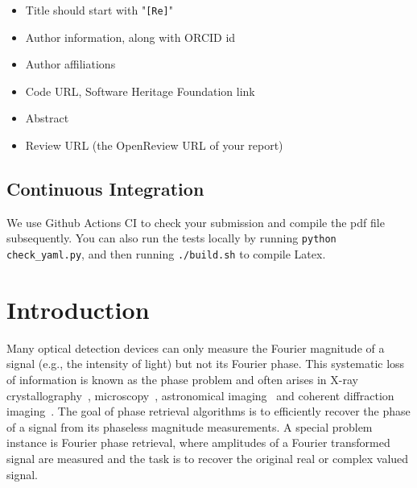 \begin{itemize}
\item Title should start with "\texttt{[Re]}"
\item Author information, along with ORCID id
\item Author affiliations
\item Code URL, Software Heritage Foundation link
\item Abstract
\item Review URL (the OpenReview URL of your report)
\end{itemize}

\subsection{Continuous Integration}

We use Github Actions CI to check your submission and compile the pdf file subsequently.
You can also run the tests locally by running \texttt{python check\_yaml.py}, and then running \texttt{./build.sh} to compile Latex.

\clearpage



\newpage
\section{Introduction}

Many optical detection devices can only measure the Fourier magnitude of a signal (e.g., the intensity of light) but not its Fourier phase. This systematic loss of information is known as the phase problem and often arises in X-ray crystallography~\cite{Millane:90}, microscopy~\cite{mico}, astronomical imaging~\cite{Fienup:19} and coherent diffraction imaging~\cite{doi:10.1137/151005099}. The goal of phase retrieval algorithms is to efficiently recover the phase of a signal from its phaseless magnitude measurements. A special problem instance is Fourier phase retrieval, where amplitudes of a Fourier transformed signal are measured and the task is to recover the original real or complex valued signal.

